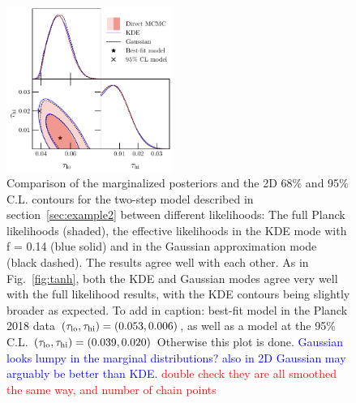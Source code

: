 \documentclass[prd,twocolumn,amsmath,amssymb,floatfix,superscriptaddress,nofootinbib]{revtex4-1}
\newcommand{\refsec}[1]{section~\ref{sec:#1}}
\newcommand{\tauhi}{\tau_{\rm hi}}
\newcommand{\taulo}{\tau_{\rm lo}}
\newcommand{\wh}[1]{\textcolor{blue}{#1}}
\newcommand{\ch}[1]{\textcolor{red}{#1}}
\begin{document}
\begin{figure}[t]
\includegraphics[width=0.48\textwidth]{paper/plots/pl18_tanh_highz_test5_run1_vs_relike_tanh_highz_test8_run9_f0p14_taulo_prior_0p03_zre_prior_6p1_taulo_prior_0p0_tri.pdf}
\caption{Comparison of the marginalized posteriors and the 2D 68\% and 95\% C.L. contours for the two-step model  described in \refsec{example2} between different likelihoods: The full Planck likelihoods (shaded), the effective likelihoods in the KDE mode with f = 0.14 (blue solid) and in the Gaussian approximation mode (black dashed). The results agree well with each other. As in Fig.~\ref{fig:tanh}, both the KDE and Gaussian modes agree very well with the full likelihood results, with the KDE  contours being slightly broader as expected. {To add in caption: best-fit model in the Planck 2018 data $(\taulo, \tauhi) = (0.053, 0.006)$, as well as  a model at the 95\% C.L. $(\taulo, \tauhi) = (0.039, 0.020)$}  {Otherwise this plot is done.} \wh{Gaussian looks lumpy in the marginal distributions?  also in 2D Gaussian may arguably be better than KDE. \ch{double check they are all smoothed the same way, and number of chain points}}
}
\label{fig:two_parameter_model_2D}
\end{figure}
\end{document}

